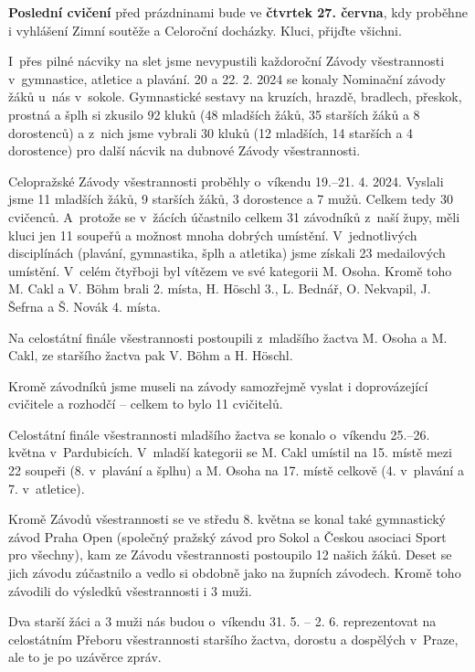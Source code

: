 \documentclass[11pt]{article}
\begin{document}
\textbf{Poslední cvičení} před prázdninami bude ve \textbf{čtvrtek 27. června}, kdy proběhne i vyhlášení Zimní soutěže a Celoroční docházky. Kluci, přijďte všichni.

I~přes pilné nácviky na slet jsme nevypustili každoroční Závody všestrannosti v~gymnastice, atletice a plavání. 20 a 22. 2. 2024 se konaly Nominační závody žáků u~nás v~sokole. Gymnastické sestavy na kruzích, hrazdě, bradlech, přeskok, prostná a šplh si zkusilo 92 kluků (48 mladších žáků, 35 starších žáků a 8 dorostenců) a z~nich jsme vybrali 30 kluků (12 mladších, 14 starších a 4 dorostence) pro další nácvik na dubnové Závody všestrannosti.

Celopražské Závody všestrannosti proběhly o~víkendu 19.–21. 4. 2024. Vyslali jsme 11 mladších žáků, 9 starších žáků, 3 dorostence a 7 mužů. Celkem tedy 30 cvičenců. A~protože se v~žácích účastnilo celkem 31 závodníků z~naší župy, měli kluci jen 11 soupeřů a možnost mnoha dobrých umístění. V~jednotlivých disciplínách (plavání, gymnastika, šplh a atletika) jsme získali 23 medailových umístění. V~celém čtyřboji byl vítězem ve své kategorii M. Osoha. Kromě toho M. Cakl a V. Böhm brali 2. místa, H. Höschl 3., L. Bednář, O. Nekvapil, J. Šefrna a Š. Novák 4. místa.

Na celostátní finále všestrannosti postoupili z~mladšího žactva M. Osoha a M. Cakl, ze staršího žactva pak V. Böhm a H. Höschl.

Kromě závodníků jsme museli na závody samozřejmě vyslat i doprovázející cvičitele a rozhodčí – celkem to bylo 11 cvičitelů.

Celostátní finále všestrannosti mladšího žactva se konalo o~víkendu 25.–26. května v~Pardubicích. V~mladší kategorii se M. Cakl umístil na 15. místě mezi 22 soupeři (8. v~plavání a šplhu) a M. Osoha na 17. místě celkově (4. v~plavání a 7. v~atletice).

Kromě Závodů všestrannosti se ve středu 8. května se konal také gymnastický závod Praha Open (společný pražský závod pro Sokol a Českou asociaci Sport pro všechny), kam ze Závodu všestrannosti postoupilo 12 našich žáků. Deset se jich závodu zúčastnilo a vedlo si obdobně jako na župních závodech. Kromě toho závodili do výsledků všestrannosti i 3 muži.

Dva starší žáci a 3 muži nás budou o~víkendu 31. 5. – 2. 6. reprezentovat na celostátním Přeboru všestrannosti staršího žactva, dorostu a dospělých v~Praze, ale to je po uzávěrce zpráv.

\signature{Jiří Novák (Jirkan)}{}
\end{document}
